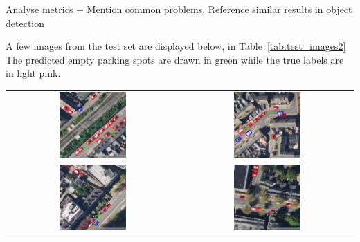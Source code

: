 Analyse metrics + Mention common problems. Reference similar results in object detection

A few images from the test set are displayed below, in Table~\ref{tab:test_images2}
The predicted empty parking spots are drawn in green while the true labels are in light pink.

\begin{table}[htbp]
    \centering
    \begin{tabular}{cc}
        \includegraphics[width=0.4\textwidth]{images/image1_empty_parking_detection_test_set.png} & \includegraphics[width=0.4\textwidth]{images/image2_empty_parking_detection_test_set.png} \\
        \includegraphics[width=0.4\textwidth]{images/image3_empty_parking_detection_test_set.png} & \includegraphics[width=0.4\textwidth]{images/image4_empty_parking_detection_test_set.png} \\

\end{tabular}
\end{table}
